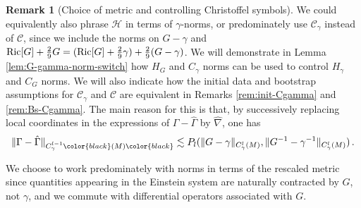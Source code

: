\documentclass[11pt,leqno,textwidth=10cm]{amsart}
\numberwithin{equation}{section}
\theoremstyle{definition}
\newtheorem{remark}[definition]{Remark}
\theoremstyle{plain}
\newcommand{\1}{\mathbbm{1}}
\newcommand{\N}{\mathbb{N}}
\newcommand{\Ric}{\text{\normalfont{Ric}}}
\newcommand{\Gamhat}{\hat{\Gamma}}
\newcommand{\nabhat}{\hat{\nabla}}
\newcommand{\change}[1]{\color{black}#1\color{black}}
\begin{document}
\begin{remark}[Choice of metric and controlling Christoffel symbols]\label{rem:relation-metric-Chr}
We could equivalently also phrase $\mathcal{H}$ in terms of $\gamma$-norms, or predominately use $\mathcal{C}_\gamma$ instead of $\mathcal{C}$, since we include the norms on $G-\gamma$ and $\Ric[G]+\frac29G=(\Ric[G]+\frac29\gamma)+\frac29(G-\gamma)$. We will demonstrate in Lemma \ref{lem:G-gamma-norm-switch} how $H_G$ and $C_\gamma$ norms can be used to control $H_\gamma$ and $C_G$ norms. We will also indicate how the initial data and bootstrap assumptions for $\mathcal{C}_\gamma$ and $\mathcal{C}$ are equivalent in Remarks \ref{rem:init-Cgamma} and \ref{rem:Bs-Cgamma}. The main reason for this is that, by successively replacing local coordinates in the expressions of $\Gamma-\Gamhat$ by $\nabhat$, one has
\begin{equation}\label{eq:Christoffel-norm-handwaving}
\|\Gamma-\Gamhat\|_{C^{l-1}_\gamma\change{(M)}}\lesssim P_l(\|G-\gamma\|_{C^l_\gamma(M)},\|G^{-1}-\gamma^{-1}\|_{C^l_\gamma(M)})\,.
\end{equation}

We choose to work predominately with norms in terms of the rescaled metric since quantities appearing in the Einstein system are naturally contracted by $G$, not $\gamma$, and we commute with differential operators associated with $G$.%

\end{remark}
\end{document}
